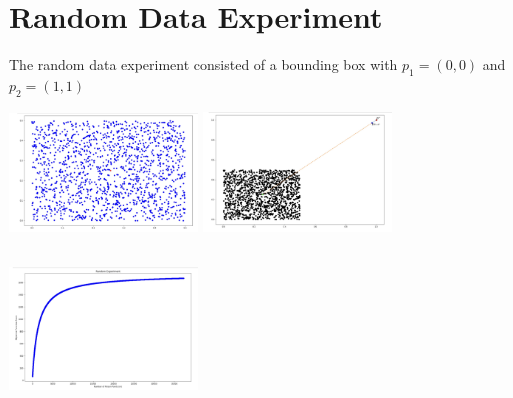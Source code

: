 \documentclass[a4paper,12pt]{article}
\begin{document}
\section{Random Data Experiment}
The random data experiment consisted of a bounding box with $p_1 = (0,0)$ and $p_2 = (1,1)$ \\
\includegraphics [width=5cm, height=4cm]{random_data}
\includegraphics [width=5cm, height=4cm]{random_data_poisoned}
\includegraphics [width=5cm, height=4cm]{random_poison_vs_score}
\end{document}
